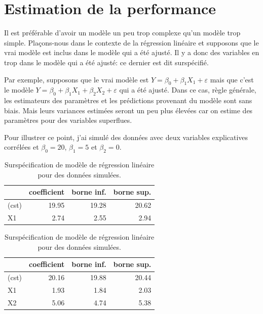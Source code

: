 \documentclass[
  11pt,
  letterpaper,
]{scrbook}
\theoremstyle{definition}
\theoremstyle{remark}
\begin{document}
\hypertarget{estimation-de-la-performance}{%
\section{Estimation de la
performance}\label{estimation-de-la-performance}}

Il est préférable d'avoir un modèle un peu trop complexe qu'un modèle
trop simple. Plaçons-nous dans le contexte de la régression linéaire et
supposons que le vrai modèle est inclus dans le modèle qui a été ajusté.
Il y a donc des variables en trop dans le modèle qui a été ajusté: ce
dernier est dit surspécifié.

Par exemple, supposons que le vrai modèle est
\(Y=\beta_0+\beta_1X_1+\varepsilon\) mais que c'est le modèle
\(Y=\beta_0+\beta_1X_1+\beta_2X_2+\varepsilon\) qui a été ajusté. Dans
ce cas, règle générale, les estimateurs des paramètres et les
prédictions provenant du modèle sont sans biais. Mais leurs variances
estimées seront un peu plus élevées car on estime des paramètres pour
des variables superflues.

Pour illustrer ce point, j'ai simulé des données avec deux variables
explicatives corrélées et \(\beta_0 = 20\), \(\beta_1=5\) et
\(\beta_2 = 0\).

\begin{table}

\caption{\label{tbl-specification}Surspécification de modèle de
régression linéaire pour des données
simulées.}\begin{minipage}[t]{\linewidth}

{\centering 

\centering
\begin{tabular}[t]{lrrr}
\toprule
  & coefficient & borne inf. & borne sup.\\
\midrule
(cst) & 19.95 & 19.28 & 20.62\\
X1 & 2.74 & 2.55 & 2.94\\
\bottomrule
\end{tabular}

}

\end{minipage}%
\newline
\begin{minipage}[t]{\linewidth}

{\centering 

\centering
\begin{tabular}[t]{lrrr}
\toprule
  & coefficient & borne inf. & borne sup.\\
\midrule
(cst) & 20.16 & 19.88 & 20.44\\
X1 & 1.93 & 1.84 & 2.03\\
X2 & 5.06 & 4.74 & 5.38\\
\bottomrule
\end{tabular}

}

\end{minipage}%

\end{table}
\end{document}
